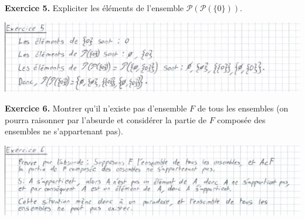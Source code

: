 \documentclass[a4paper, 10pt]{report}
\begin{document}
	\vspace{5mm}
	\noindent
	\textbf{Exercice 5.} Expliciter les éléments de l'ensemble
	$\mathcal{P}(\mathcal{P}(\{0\}))$.
	
	\includegraphics{02B - ex05.jpg}
	
	\vspace{5mm}
	\noindent
	{\color{red}\textbf{Exercice 6.}}
	Montrer qu'il n'existe pas d'ensemble $F$ de tous les ensembles
	(on pourra raisonner par l'absurde et considérer la partie de $F$
	composée des ensembles ne s'appartenant pas).
	
	\includegraphics{02B - ex06.jpg}
	
\end{document}
